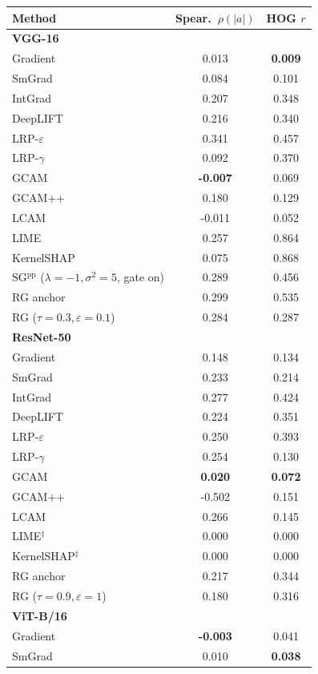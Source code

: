 \begin{tabular}{l c c}
\toprule
Method & Spear.\ $\rho(|a|)$ & HOG $r$ \\
\midrule
\multicolumn{3}{l}{\textbf{VGG-16}} \\
\midrule
Gradient & 0.013 & \textbf{0.009} \\
SmGrad & 0.084 & 0.101 \\
IntGrad & 0.207 & 0.348 \\
DeepLIFT & 0.216 & 0.340 \\
LRP-$\varepsilon$ & 0.341 & 0.457 \\
LRP-$\gamma$ & 0.092 & 0.370 \\
GCAM & \textbf{-0.007} & 0.069 \\
GCAM++ & 0.180 & 0.129 \\
LCAM & -0.011 & 0.052 \\
LIME & 0.257 & 0.864 \\
KernelSHAP & 0.075 & 0.868 \\
SG$^{\mathrm{pp}}$ ($\lambda{=}{-}1,\sigma^2{=}5$, gate on) & 0.289 & 0.456 \\
RG anchor & 0.299 & 0.535 \\
RG ($\tau{=}0.3,\varepsilon{=}0.1$) & 0.284 & 0.287 \\
\midrule
\multicolumn{3}{l}{\textbf{ResNet-50}} \\
\midrule
Gradient & 0.148 & 0.134 \\
SmGrad & 0.233 & 0.214 \\
IntGrad & 0.277 & 0.424 \\
DeepLIFT & 0.224 & 0.351 \\
LRP-$\varepsilon$ & 0.250 & 0.393 \\
LRP-$\gamma$ & 0.254 & 0.130 \\
GCAM & \textbf{0.020} & \textbf{0.072} \\
GCAM++ & -0.502 & 0.151 \\
LCAM & 0.266 & 0.145 \\
LIME$^{\ddagger}$ & 0.000 & 0.000 \\
KernelSHAP$^{\ddagger}$ & 0.000 & 0.000 \\
RG anchor & 0.217 & 0.344 \\
RG ($\tau{=}0.9,\varepsilon{=}1$) & 0.180 & 0.316 \\
\midrule
\multicolumn{3}{l}{\textbf{ViT-B/16}} \\
\midrule
Gradient & \textbf{-0.003} & 0.041 \\
SmGrad & 0.010 & \textbf{0.038} \\

\end{tabular}
